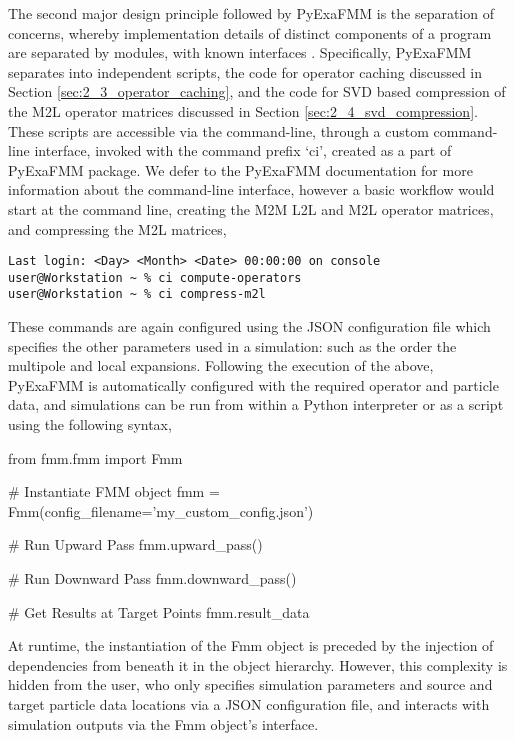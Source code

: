 The second major design principle followed by \gls{PyExaFMM} is
the separation of concerns, whereby implementation details of distinct
components of a program are separated by modules, with known interfaces
\cite{Gamma:1994:Addison}. Specifically, \gls{PyExaFMM} separates into independent
scripts, the code for operator caching discussed in Section \ref{sec:2_3_operator_caching},
and the code for SVD based compression of the M2L operator matrices discussed in
Section \ref{sec:2_4_svd_compression}. These scripts are accessible via the
command-line, through a custom command-line interface, invoked with the command
prefix `ci', created as a part of \gls{PyExaFMM} package. We defer to the \gls{PyExaFMM}
documentation for more information about the command-line interface, however a
basic workflow would start at the command line, creating the \gls{M2M}
\gls{L2L} and \gls{M2L} operator matrices, and compressing the \gls{M2L} matrices,

\begin{verbatim}
Last login: <Day> <Month> <Date> 00:00:00 on console
user@Workstation ~ % ci compute-operators
user@Workstation ~ % ci compress-m2l
\end{verbatim}

These commands are again configured using the \gls{JSON} configuration file
which specifies the other parameters used in a simulation: such as the order the
multipole and local expansions. Following the execution of the above,
\gls{PyExaFMM} is automatically configured with the required
operator and particle data, and simulations can be run from within a Python
interpreter or as a script using the following syntax,

\begin{python}
from fmm.fmm import Fmm

# Instantiate FMM object
fmm = Fmm(config_filename='my_custom_config.json')

# Run Upward Pass
fmm.upward_pass()

# Run Downward Pass
fmm.downward_pass()

# Get Results at Target Points
fmm.result_data
\end{python}

At runtime, the instantiation of the Fmm object is preceded by the injection of
dependencies from beneath it in the object hierarchy. However, this complexity is
hidden from the user, who only specifies simulation parameters and source
and target particle data locations via a \gls{JSON} configuration file, and interacts
with simulation outputs via the Fmm object's interface.

